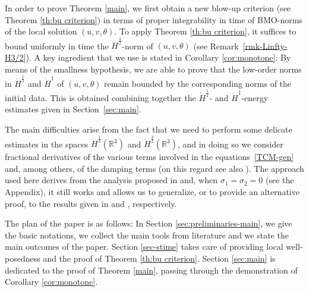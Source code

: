 \documentclass[a4paper]{article}
\newcommand{\R}{\mathbb{R}}
\begin{document}
   In order to prove Theorem \ref{main}, we first obtain a new
   blow-up criterion (see Theorem \ref{th:bu criterion}) in terms of
   proper integrability in time of \textrm{BMO}-norms of the local solution
   $(u,v,\theta)$. To apply Theorem \ref{th:bu criterion}, it
   suffices to bound uniformly in time the $\dot H^{\frac32}$-norm of
   $(u,v,\theta)$ (see Remark~\ref{rmk-Linfty-H3/2}). A key ingredient
   that we use is stated in Corollary \ref{cor:monotone}: By means of
   the smallness hypothesis, we are able to prove that the low-order
   norms in $\dot H^{\frac12}$ and $\dot H^1$ of $(u,v,\theta)$ remain
   bounded by the corresponding norms of the initial data. This is
   obtained combining together the $\dot H^{\frac12}$- and
   $\dot H^1$-energy estimates given in Section~\ref{sec:main}.
    
   The main difficulties arise from the fact that we need to perform
   some delicate estimates in the spaces $\dot H^{\frac12}(\R^3)$ and
   $\dot H^{\frac32}(\R^3)$, and in doing so we 
   consider fractional derivatives of the various terms involved in
   the equations~\eqref{TCM-gen} and, among others, of the damping
   terms (on this regard see also \cite{Chae, Chae-Lee, Zhao,
     Zhang-Xu}). The approach used here derives from the analysis
   proposed in \cite{Chae, Chae-Lee} and, when $\sigma_1=\sigma_2=0$
   (see the Appendix), it still works and allows us to generalize, or
   to provide an alternative proof, to the results given in
   \cite{Zhang-Xu} and \cite{Wang-Zhang-Pan}, respectively.
   \smallskip
    
   The plan of the paper is as follows: In Section
   \ref{sec:preliminaries-main}, we give the basic notations, we
   collect the main tools from literature and we state the main
   outcomes of the paper. Section \ref{sec-stime} takes care of
   providing local well-posedness and the proof of Theorem \ref{th:bu
     criterion}. Section \ref{sec:main} is dedicated to the proof of
   Theorem \ref{main}, passing through the demonstration of Corollary
   \ref{cor:monotone}.
\end{document}
